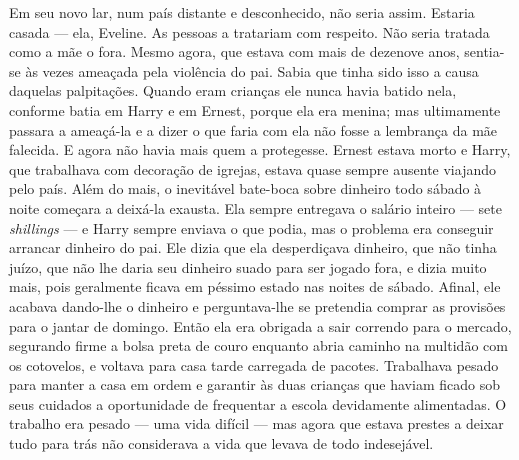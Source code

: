 Em seu novo lar, num país distante e desconhecido, não seria assim.  Estaria
casada --- ela, Eveline.  As pessoas a tratariam com respeito.  Não seria
tratada como a mãe o fora.  Mesmo agora, que estava com mais de dezenove anos,
sentia-se às vezes ameaçada pela violência do pai.  Sabia que tinha sido isso a
causa daquelas palpitações.  Quando eram crianças ele nunca havia batido nela,
conforme batia em Harry e em Ernest, porque ela era menina; mas ultimamente
passara a ameaçá-la e a dizer o que faria com ela não fosse a lembrança da mãe
falecida.  E agora não havia mais quem a protegesse.  Ernest estava morto e
Harry, que trabalhava com decoração de igrejas, estava quase sempre ausente
viajando pelo país.  Além do mais, o inevitável bate-boca sobre dinheiro todo
sábado à noite começara a deixá-la exausta.  Ela sempre entregava o salário
inteiro --- sete \textit{shillings} --- e Harry sempre enviava o que podia, mas
o problema era conseguir arrancar dinheiro do pai.  Ele dizia que ela
desperdiçava dinheiro, que não tinha juízo, que não lhe daria seu dinheiro
suado para ser jogado fora, e dizia muito mais, pois geralmente ficava em
péssimo estado nas noites de sábado.  Afinal, ele acabava dando-lhe o dinheiro
e perguntava-lhe se pretendia comprar as provisões para o jantar de domingo.
Então ela era obrigada a sair correndo para o mercado, segurando firme a bolsa
preta de couro enquanto abria caminho na multidão com os cotovelos, e voltava
para casa tarde carregada de pacotes.  Trabalhava pesado para manter a casa em
ordem e garantir às duas crianças que haviam ficado sob seus cuidados a
oportunidade de frequentar a escola devidamente alimentadas.  O trabalho era
pesado --- uma vida difícil --- mas agora que estava prestes a deixar tudo para
trás não considerava a vida que levava de todo indesejável.

